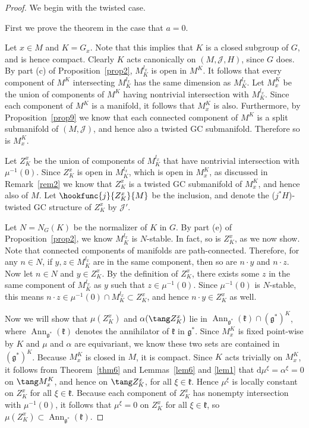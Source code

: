 \begin{proof}
We begin with the twisted case.

First we prove the theorem in the case that $a=0$.

Let $x \in M$ and $K = G_x$.
Note that this implies that $K$ is a closed subgroup of $G$, and is hence compact.
Clearly $K$ acts canonically on $(M,\mathcal{J},H)$, since $G$ does.
By part (c) of Proposition~\ref{prop2}, $M_K^{l_x}$ is open in $M^K$.
It follows that every component of $M^K$ intersecting $M_K^{l_x}$ has the same dimension as $M_K^{l_x}$.
Let $M_x^K$ be the union of components of $M^K$ having nontrivial intersection with $M_K^{l_x}$.
Since each component of $M^K$ is a manifold, it follows that $M_x^K$ is also.
Furthermore, by Proposition~\ref{prop9} we know that each connected component of $M^K$ is a split submanifold of $(M,\mathcal{J})$, and hence also a twisted GC submanifold.
Therefore so is $M_x^K$.

Let $Z_K^x$ be the union of components of $M_K^{l_x}$ that have nontrivial intersection with $\mu^{-1}(0)$.
Since $Z_K^x$ is open in $M_K^{l_x}$, which is open in $M_x^K$, as discussed in Remark~\ref{rem2} we know that $Z_K^x$ is a twisted GC submanifold of $M_x^K$, and hence also of $M$.
Let $\hookfunc{j}{Z_K^x}{M}$ be the inclusion, and denote the ($j^*H$)-twisted GC structure of $Z_K^x$ by $\mathcal{J}'$.

Let $N=N_G(K)$ be the normalizer of $K$ in $G$.  By part (e) of Proposition~\ref{prop2}, we know $M_K^{l_x}$ is $N$-stable.  In fact, so is $Z_K^x$, as we now show.  Note that connected components of manifolds are path-connected.  Therefore, for any $n \in N$, if $y,z \in M_K^{l_x}$ are in the same component, then so are $n \cdot y$ and $n \cdot z$.
Now let $n \in N$ and $y \in Z_K^x$.
By the def\/inition of $Z_K^x$, there exists some $z$ in the same component of $M_K^{l_x}$ as $y$ such that $z \in \mu^{-1}(0)$.
Since $\mu^{-1}(0)$ is $N$-stable, this means $n \cdot z \in \mu^{-1}(0) \cap M_K^{l_x} \subset Z_K^x$, and hence $n \cdot y \in Z_K^x$ as well.

Now we will show that $\mu(Z_K^x)$ and $\alpha( \tang Z_K^x)$ lie in $\operatorname{Ann}_{\mathfrak{g}^*} (\mathfrak{k}) \cap (\mathfrak{g}^*)^K$, where $\operatorname{Ann}_{\mathfrak{g}^*} (\mathfrak{k})$ denotes the annihilator of $\mathfrak{k}$ in $\mathfrak{g}^*$.
Since $M_x^K$ is f\/ixed point-wise by $K$ and $\mu$ and $\alpha$ are equivariant, we know these two sets are contained in $(\mathfrak{g}^*)^K$.
Because $M_x^K$ is closed in $M$, it is compact.  Since $K$ acts trivially on $M_x^K$, it follows from Theorem~\ref{thm6} and Lemmas~\ref{lem6} and \ref{lem1} that $\mathrm{d} \mu^{\xi} = \alpha^{\xi} = 0$ on $\tang M_x^K$, and hence on $\tang Z_K^x$, for all $\xi \in \mathfrak{k}$.
Hence $\mu^{\xi}$ is locally constant on $Z_K^x$ for all $\xi \in \mathfrak{k}$.
Because each component of $Z_K^x$ has nonempty intersection with $\mu^{-1}(0)$, it follows that $\mu^{\xi} = 0$ on $Z_K^x$ for all $\xi \in \mathfrak{k}$, so $\mu(Z_K^x) \subset \operatorname{Ann}_{\mathfrak{g}^*} (\mathfrak{k})$.


\end{proof}
